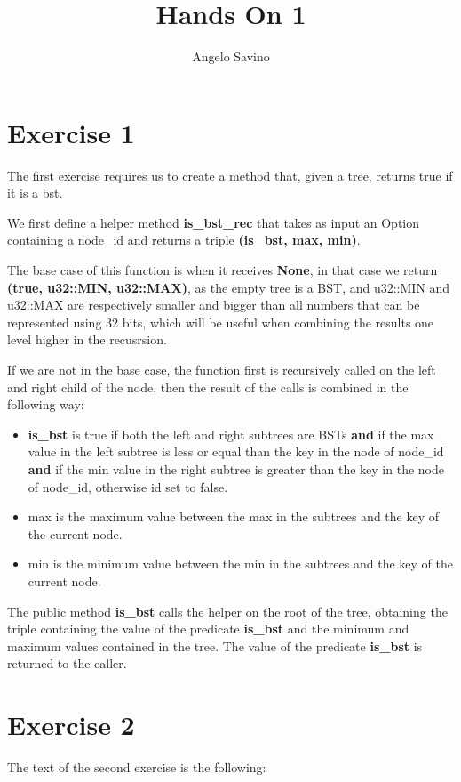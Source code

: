 \documentclass[12pt,a4paper]{article}
\title{Hands On 1}
\author{Angelo Savino}
\begin{document}
\maketitle

\section*{Exercise 1}
The first exercise requires us to create a method that, given a tree, returns true if it is a bst.

We first define a helper method \textbf{is\_bst\_rec} that takes as input an Option containing a node\_id and returns a triple \textbf{(is\_bst, max, min)}. 

The base case of this function is when it receives \textbf{None}, in that case we return \textbf{(true, u32::MIN, u32::MAX)}, as the empty tree is a BST, and u32::MIN and u32::MAX are respectively smaller and bigger than all numbers that can be represented using 32 bits, which will be useful when combining the results one level higher in the recusrsion.

If we are not in the base case, the function first is recursively called on the left and right child of the node, then the result of the calls is combined in the following way:

\begin{itemize}
    \item \textbf{is\_bst} is true if both the left and right subtrees are BSTs \textbf{and} if the max value in the left subtree is less or equal than the key in the node of node\_id \textbf{and} if the min value in the right subtree is greater than the key in the node of node\_id, otherwise id set to false.
    \item max is the maximum value between the max in the subtrees and the key of the current node.
    \item min is the minimum value between the min in the subtrees and the key of the current node.
\end{itemize}

The public method \textbf{is\_bst} calls the helper on the root of the tree, obtaining the triple containing the value of the predicate \textbf{is\_bst} and the minimum and maximum values contained in the tree. The value of the predicate \textbf{is\_bst} is returned to the caller.

\pagebreak
\section*{Exercise 2}
The text of the second exercise is the following:
\end{document}
